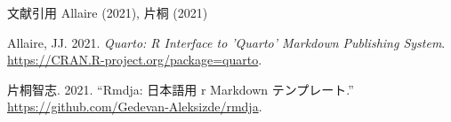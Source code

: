 \documentclass[
  ignorenonframetext,
]{beamer}
\newlength{\cslhangindent}
\newlength{\cslentryspacingunit} %
\newenvironment{CSLReferences}[2] %
 {%
  \setlength{\parindent}{0pt}
  \ifodd #1
  \let\oldpar\par
  \def\par{\hangindent=\cslhangindent\oldpar}
  \fi
  \setlength{\parskip}{#2\cslentryspacingunit}
 }%
 {}
\begin{document}
\begin{frame}{文献引用}
\protect\hypertarget{ux6587ux732eux5f15ux7528}{}
Allaire (2021), 片桐 (2021)

\hypertarget{refs}{}
\begin{CSLReferences}{1}{0}
\leavevmode{}%
Allaire, JJ. 2021. \emph{Quarto: R Interface to 'Quarto' Markdown
Publishing System}. \url{https://CRAN.R-project.org/package=quarto}.

\leavevmode{}%
片桐智志. 2021. {``Rmdja: 日本語用 r Markdown テンプレート.''}
\url{https://github.com/Gedevan-Aleksizde/rmdja}.

\end{CSLReferences}
\end{frame}
\end{document}
